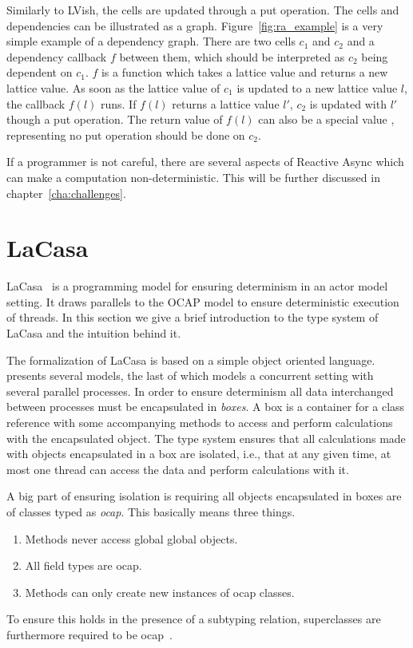 Similarly to LVish, the cells are updated through a put operation.  The cells and
dependencies can be illustrated as a graph.  Figure~\ref{fig:ra_example} is a
very simple example of a dependency graph.  There are two cells $c_1$ and $c_2$
and a dependency callback $f$ between them, which should be interpreted as $c_2$
being dependent on $c_1$.  $f$ is a function which takes a lattice value and
returns a new lattice value.  As soon as the lattice value of
$c_1$ is updated to a new lattice value $l$, the callback $f(l)$ runs. If $f(l)$
returns a lattice value $l'$, $c_2$ is updated with $l'$ though a put operation.
The return value of $f(l)$ can also be a special value ,
representing no put operation should be done on $c_2$.

If a programmer is not careful, there are several aspects of Reactive Async
which can make a computation non-deterministic. This will be further discussed
in chapter~\ref{cha:challenges}. 



\section{LaCasa}\label{sec:lacasa}

LaCasa~\parencite{conf/oopsla/HallerL16} is a programming model for ensuring
determinism in an actor model~\parencite{Hewi73a} setting. It draws
parallels to the OCAP model to ensure deterministic execution of threads. In
this section we give a brief introduction to the type system of LaCasa and the
intuition behind it.

The formalization of LaCasa is based on a simple object oriented language.
\textcite{conf/oopsla/HallerL16} presents several models, the last of which
models a concurrent setting with several parallel processes. In order to ensure
determinism all data interchanged between processes must be encapsulated in
\emph{boxes}. A box is a container for a class reference with some accompanying
methods to access and perform calculations with the encapsulated object. The
type system ensures that all calculations made with objects encapsulated in a box
are isolated, i.e., that at any given time, at most one thread can access the
data and perform calculations with it.

A big part of ensuring isolation is requiring all objects encapsulated in boxes
are of classes typed as \emph{ocap}. This basically means three things.
\begin{enumerate}
  \item Methods never access global global objects.
  \item All field types are ocap.
  \item Methods can only create new instances of ocap classes.
\end{enumerate}
To ensure this holds in the presence of a subtyping relation, superclasses are
furthermore required to be ocap~\parencite{conf/oopsla/HallerL16}.

